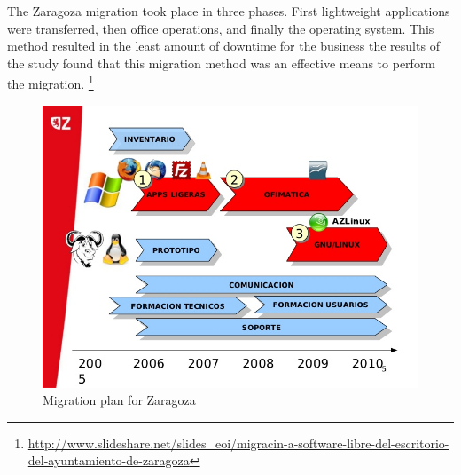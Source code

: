   The Zaragoza migration took place in three phases. First lightweight applications were transferred, then office operations, and finally the operating system. This method resulted in the least amount of downtime for the business the results of the study found that this migration method was an effective means to perform the migration. 
 \footnote{\url{http://www.slideshare.net/slides\_eoi/migracin-a-software-libre-del-escritorio-del-ayuntamiento-de-zaragoza}}
 \begin{figure}[H]
 \centering
     \includegraphics[scale=0.5]{img/desktopplan.jpg} 
  \caption[Migration plan in Zaragoza]{Migration plan for Zaragoza \protect\footnotemark}   
     \label {fig:plan-Zara}
     \end{figure}
     
